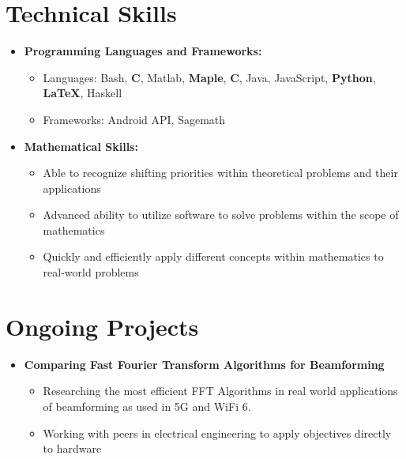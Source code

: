 \documentclass[11pt,letterpaper,sans]{moderncv}
\renewcommand{\_}{\textscale{.7}{\textunderscore}}
\newcommand{\Rplus}{\protect\hspace{-.1em}\protect\raisebox{.35ex}{\smaller{\smaller\textbf{+}}}}
\newcommand{\Cpp}{\mbox{C\Rplus\Rplus}\xspace}
\begin{document}
\section{Technical Skills}
\vspace{1em}
\begin{itemize}
\item \textbf{Programming Languages and Frameworks:}
\begin{itemize}
    \item {Languages:} Bash, \textbf{C}, Matlab, \textbf{Maple}, \textbf{\Cpp}, Java, JavaScript, \textbf{Python}, \textbf{\LaTeX}, Haskell
    \item {Frameworks:} Android API, Sagemath
\end{itemize}
\vspace{0.5em}
\item \textbf{Mathematical Skills:}
\begin{itemize}
    \item Able to recognize shifting priorities within theoretical problems and their applications
    \item Advanced ability to utilize software to solve problems within the scope of mathematics
    \item Quickly and efficiently apply different concepts within mathematics to real-world problems
\end{itemize}
\end{itemize}
\vspace{0.5em}


\section{Ongoing Projects}
\vspace{1em}
\begin{itemize}
\item \textbf{Comparing Fast Fourier Transform Algorithms for Beamforming}
\begin{itemize}
    \item Researching the most efficient FFT Algorithms in real world applications of beamforming as used in 5G and WiFi 6.
    \item Working with peers in electrical engineering to apply objectives directly to hardware
\end{itemize}
\end{itemize}
\vspace*{-5cm}
\end{document}
